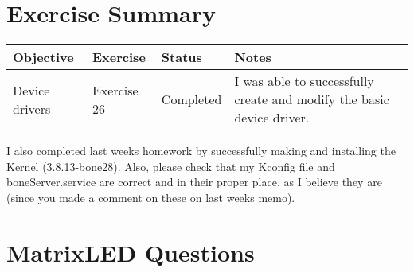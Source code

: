\documentclass[letterpaper,10pt]{texMemo}
\begin{document}
\maketitle

\section{Exercise Summary}

\begin{center}
\begin{tabular}{|p{4cm}|l|l|p{8cm}|}
\hline
\textbf{Objective} & \textbf{Exercise} &\textbf{Status} & \textbf{Notes}\\
\hline
 Device drivers & Exercise 26  & Completed & I was able to successfully create
and modify the basic device driver.\\
\hline
\end{tabular}
\end{center}

\noindent I also completed last weeks homework by successfully making and
installing the Kernel (3.8.13-bone28). Also, please check that my Kconfig file
and boneServer.service are correct and in their proper place, as I believe they
are (since you made a comment on these on last weeks memo).

\section{MatrixLED Questions}
\end{document}
